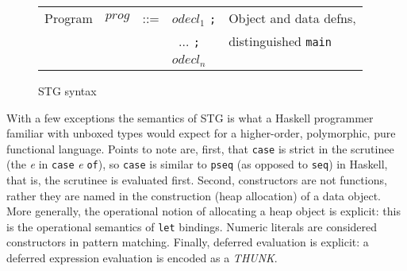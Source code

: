 \documentclass{llncs}
\begin{document}
\begin{figure}
\begin{tabular}{r r c l l}
Program      & $\mathit{prog}$ & ::= & $\mathit{odecl}_1$ \texttt{;}            & Object and data defns, \\
             &                 &     & \texttt{ } $\dots$ \texttt{;}                & distinguished \texttt{main}\\
             &                 &     & $\mathit{odecl}_n$ & 

\end{tabular}
\caption{STG syntax}
\label{fig:STGsyntax}
\end{figure}

With a few exceptions the semantics of STG is what a Haskell programmer
familiar with unboxed types would expect for a higher-order, polymorphic, pure
functional language.  Points to note are, first, that \texttt{case} is strict
in the scrutinee (the \emph{e} in \texttt{case} \emph{e} \texttt{of}), so \texttt{case} is
similar to \texttt{pseq} (as opposed to \texttt{seq}) in Haskell, that is, the
scrutinee is evaluated first.  Second, constructors are not functions, rather
they are named in the construction (heap allocation) of a data object.  More
generally, the operational notion of allocating a heap object is explicit:
this is the operational semantics of \texttt{let} bindings.  Numeric literals
are considered constructors in pattern matching.
Finally, deferred evaluation is explicit:
a deferred expression evaluation is encoded as a \emph{THUNK}.
\end{document}
